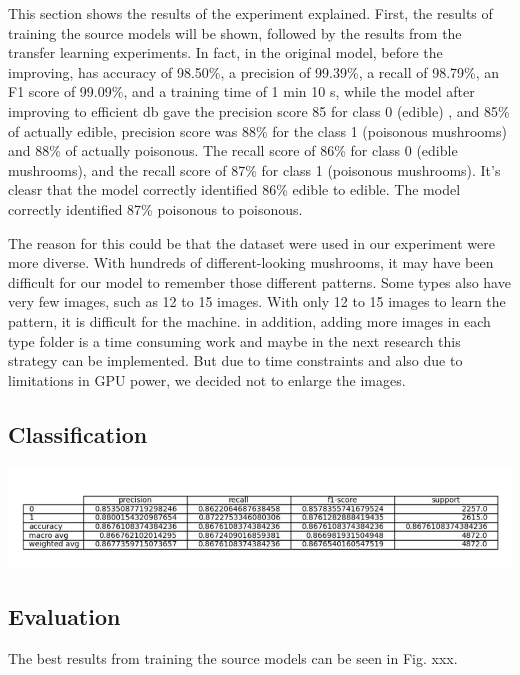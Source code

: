 This section shows the results of the experiment explained. First, the results of training the source models  will be shown, followed by the results from the transfer
learning experiments.
In fact, in the original model, before the improving, has accuracy of 98.50\%, a precision of 99.39\%, a recall of 98.79\%, an F1 score of 99.09\%, and a training time of 1 min 10 s, while the model after improving to efficient db gave the precision score 85 for class 0 (edible) , and 85\% of actually edible,  precision score was 88\% for the class 1 (poisonous mushrooms)  and 88\% of actually poisonous.
The recall score of 86\% for class 0 (edible mushrooms), and the recall score of 87\% for class 1 (poisonous mushrooms). It's cleasr that the model correctly identified 86\% edible to edible. The model correctly identified 87\% poisonous to poisonous.

The reason for this could be that the dataset were used in our experiment were more diverse. With hundreds of different-looking mushrooms, it may have been difficult for our model to remember those different patterns. Some types also have very few images, such as 12 to 15 images. With only 12 to 15 images to learn the pattern, it is difficult for the machine. 
in addition, adding more images in each type folder is a time consuming work and maybe in the next research this strategy can be implemented. But due to time constraints and also due to limitations in GPU power, we decided not to enlarge the images.



\subsection{Classification}
\centering
\includegraphics[width=.5\textwidth]{figures/classification.PNG}
\hfill \break


\subsection{Evaluation}
The best results from training the source models can be
 seen in Fig. xxx. 
 